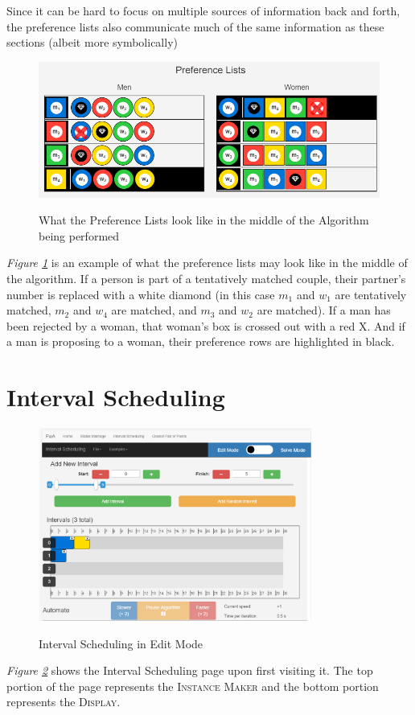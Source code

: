 Since it can be hard to focus on multiple sources of information back and forth, 
the preference lists also communicate much of the same information as these 
sections (albeit more symbolically)
\begin{figure}[H]
  \caption{What the Preference Lists look like in the middle of the Algorithm being performed}
  \includegraphics[width=\linewidth]
  {images/stable-marriage/sm-algorithm-running.png}
  \label{fig-sm-algorithm-running}
  \centering
\end{figure}
\textit{Figure \ref{fig-sm-algorithm-running}} is an example of what the
preference lists may look like in the middle of the algorithm.
If a person is part of a tentatively matched couple, their partner's number
is replaced with a white diamond 
(in this case $m_1$ and $w_1$ are tentatively matched, 
$m_2$ and $w_4$ are matched, and $m_3$ and $w_2$ are matched).
If a man has been rejected by a woman, 
that woman's box is crossed out with a red X. 
And if a man is proposing to a woman, their preference rows are highlighted in black. 
\section{Interval Scheduling}
\begin{figure}[H]
	\caption{Interval Scheduling in Edit Mode}
	\includegraphics[height=2.5in]
	{images/interval-scheduling/interval-scheduling-edit.png}
	\label{fig-interval-scheduling-edit}
	\centering
\end{figure}
\textit{Figure \ref{fig-interval-scheduling-edit}} shows the Interval Scheduling page
upon first visiting it. 
The top portion of the page represents the \textsc{Instance Maker} and the bottom 
portion represents the \textsc{Display}. 
